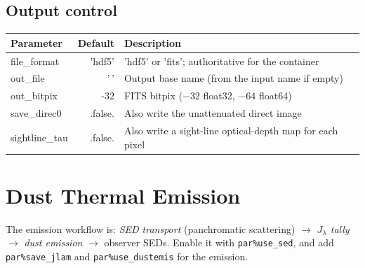 \documentclass[english,a4paper]{kiseon_memo}
\newcommand{\pp}[1]{\texttt{par\%#1}}
\begin{document}
\subsection{Output control}
\begin{longtable}{P D X}
\toprule
\textrm{Parameter} & \textrm{Default} & \textrm{Description}\\
\midrule \endhead
file\_format       & 'hdf5' & 'hdf5' or 'fits'; authoritative for the container\\
out\_file          & '\,'   & Output base name (from the input name if empty)\\
out\_bitpix        & -32    & FITS bitpix ($-32$ float32, $-64$ float64)\\
save\_direc0       & .false.& Also write the unattenuated direct image\\
sightline\_tau     & .false.& Also write a sight-line optical-depth map for each pixel\\
\bottomrule
\end{longtable}

\section{Dust Thermal Emission}\label{sec:emission}
The emission workflow is: \emph{SED transport} (panchromatic scattering) $\to$
\emph{$J_\lambda$ tally} $\to$ \emph{dust emission} $\to$ observer SEDs.  Enable
it with \pp{use\_sed}, and add \pp{save\_jlam} and \pp{use\_dustemis} for the
emission.
\end{document}
